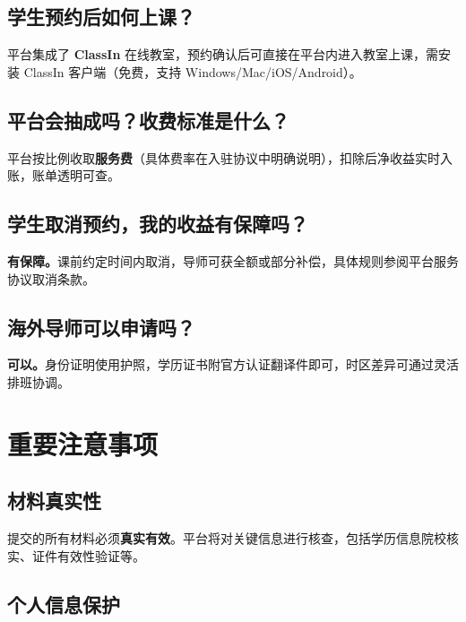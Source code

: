 \documentclass[a4paper,10pt]{article}
\begin{document}
\subsection{学生预约后如何上课？}

平台集成了 \textbf{ClassIn} 在线教室，预约确认后可直接在平台内进入教室上课，需安装 ClassIn 客户端（免费，支持 Windows/Mac/iOS/Android）。

\subsection{平台会抽成吗？收费标准是什么？}

平台按比例收取\textbf{服务费}（具体费率在入驻协议中明确说明），扣除后净收益实时入账，账单透明可查。

\subsection{学生取消预约，我的收益有保障吗？}

\textbf{有保障。}课前约定时间内取消，导师可获全额或部分补偿，具体规则参阅平台服务协议取消条款。

\subsection{海外导师可以申请吗？}

\textbf{可以。}身份证明使用护照，学历证书附官方认证翻译件即可，时区差异可通过灵活排班协调。

\renewcommand{\thesubsection}{\arabic{section}.\arabic{subsection}}

\bigskip

\section{重要注意事项}

\subsection{材料真实性}

\begin{warnbox}
提交的所有材料必须\textbf{真实有效}。平台将对关键信息进行核查，包括学历信息院校核实、证件有效性验证等。
\end{warnbox}

\subsection{个人信息保护}
\end{document}
